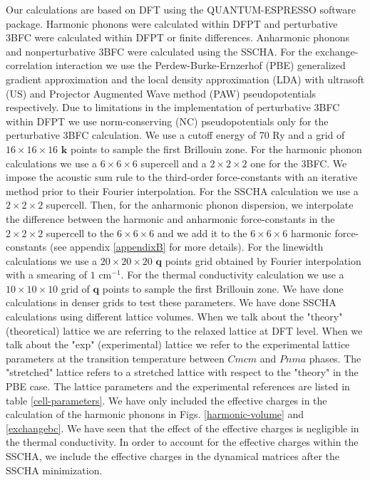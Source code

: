 Our calculations are based on DFT using the QUANTUM-ESPRESSO\cite{giannozzi2009quantum} software package. Harmonic phonons were calculated within DFPT and perturbative 3BFC were calculated within DFPT or finite 
differences\cite{li2014shengbte}. Anharmonic phonons and nonperturbative 3BFC were calculated using the SSCHA. For the exchange-correlation interaction we use the Perdew-Burke-Ernzerhof (PBE) generalized gradient 
approximation and the local density approximation (LDA) with ultrasoft (US) and Projector Augmented Wave method (PAW) pseudopotentials respectively. Due to limitations in the implementation of perturbative 3BFC 
within DFPT we use norm-conserving (NC) pseudopotentials only for the perturbative 3BFC calculation. We use a cutoff 
energy of 70 Ry and a grid of $16\times16\times16$ $\boldsymbol{k}$ points to sample the first Brillouin zone. For 
the harmonic phonon calculations we use a $6\times6\times6$ supercell and a $2\times2\times2$ one for the 3BFC. 
We impose the acoustic sum rule to the third-order force-constants with an iterative method prior to their Fourier
interpolation\cite{paulatto2013anharmonic,aseginolaza2019phonon}. For the SSCHA calculation we use a 
$2\times2\times2$ supercell. Then, for the anharmonic phonon dispersion, we 
interpolate the difference between the harmonic and anharmonic force-constants in the $2\times2\times2$ supercell to 
the $6\times6\times6$ and we add it to the $6\times6\times6$ harmonic force-constants (see appendix \ref{appendixB} 
for more details). For the linewidth calculations we use a $20\times20\times20$ $\boldsymbol{q}$ points grid 
obtained by Fourier interpolation with a smearing of $1$ cm$^{-1}$. For the thermal conductivity calculation we use 
a $10\times10\times10$ grid of $\boldsymbol{q}$ points to sample the first Brillouin zone. We have done calculations 
in denser grids to test these parameters. We have done SSCHA calculations using different lattice volumes. When we talk about the "theory" (theoretical) lattice we are referring to the relaxed lattice at DFT level. When we talk about the "exp" (experimental) lattice we refer to the experimental lattice parameters at the transition temperature between $Cmcm$ and $Pnma$ phases. The "stretched" lattice refers to a stretched lattice with respect to the "theory" in the PBE case. The lattice parameters and the experimental references are listed in table \ref{cell-parameters}. We have 
only included the effective charges in the calculation of the harmonic phonons in Figs. \ref{harmonic-volume} and 
\ref{exchangebc}. We have seen that the effect of the effective charges is negligible in the thermal conductivity. 
In order to account for the effective charges within the SSCHA, we include the effective charges in the dynamical 
matrices after the SSCHA minimization.

